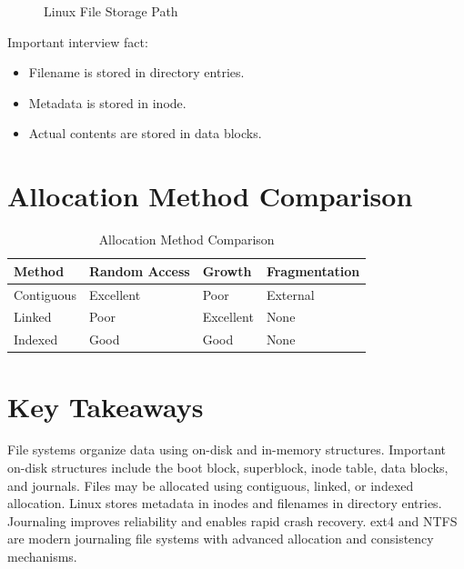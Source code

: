 \begin{figure}[H]
\centering
{}
\caption{Linux File Storage Path}
\end{figure}

Important interview fact:

\begin{itemize}
\item Filename is stored in directory entries.
\item Metadata is stored in inode.
\item Actual contents are stored in data blocks.
\end{itemize}

\section{Allocation Method Comparison}

\begin{table}[H]
\centering
\begin{tabular}{llll}
\toprule
Method & Random Access & Growth & Fragmentation \\
\midrule
Contiguous & Excellent & Poor & External \\
Linked & Poor & Excellent & None \\
Indexed & Good & Good & None \\
\bottomrule
\end{tabular}
\caption{Allocation Method Comparison}
\end{table}

\section{Key Takeaways}

\begin{keytakeaways}
File systems organize data using on-disk and in-memory structures. Important on-disk structures include the boot block, superblock, inode table, data blocks, and journals. Files may be allocated using contiguous, linked, or indexed allocation. Linux stores metadata in inodes and filenames in directory entries. Journaling improves reliability and enables rapid crash recovery. ext4 and NTFS are modern journaling file systems with advanced allocation and consistency mechanisms.
\end{keytakeaways}

